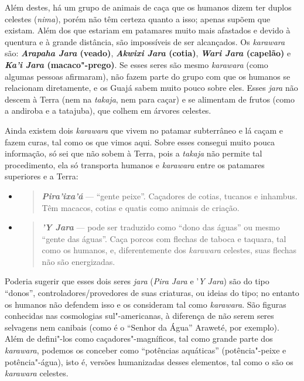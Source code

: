 Além destes, há um grupo de animais de caça que os humanos dizem ter
duplos celestes (\emph{nima}), porém não têm certeza quanto a isso;
apenas supõem que existam. Além dos que estariam em patamares muito mais
afastados e devido à quentura e à grande distância, são impossíveis de
ser alcançados. Os \emph{karawara} são: \textbf{\emph{Arapaha Jara}
(veado)}, \textbf{\emph{Akwixi Jara} (cotia)}, \textbf{\emph{Wari Jara}
(capelão)} e \textbf{\emph{Ka'i Jara} (macaco"-prego)}. Se esses seres
são mesmo \emph{karawara} (como algumas pessoas afirmaram), não fazem
parte do grupo com que os humanos se relacionam diretamente, e os Guajá
sabem muito pouco sobre eles. Esses \emph{jara} não descem à Terra (nem
na \emph{takaja}, nem para caçar) e se alimentam de frutos (como a
andiroba e a tatajuba), que colhem em árvores celestes.

Ainda existem dois \emph{karawara} que vivem no patamar subterrâneo e lá
caçam e fazem curas, tal como os que vimos aqui. Sobre esses consegui
muito pouca informação, só sei que não sobem à Terra, pois a
\emph{takaja} não permite tal procedimento, ela só transporta humanos e
\emph{karawara} entre os patamares superiores e a Terra:

\begin{itemize}
\item
  \begin{quote}
  \emph{\textbf{Pira'ixa'á}} --- ``gente peixe''. Caçadores de cotias,
  tucanos e inhambus. Têm macacos, cotias e quatis como animais de
  criação. 
  \end{quote}
\item
  \begin{quote}
  \emph{\textbf{'Y Jara}} --- pode ser traduzido como ``dono das águas'' ou
  mesmo ``gente das águas''. Caça porcos com flechas de taboca e
  taquara, tal como os humanos, e, diferentemente dos \emph{karawara}
  celestes, suas flechas não são energizadas.
  \end{quote}
\end{itemize}

Poderia sugerir que esses dois seres \emph{jara} (\emph{Pira Jara} e
'\emph{Y Jara}) são do tipo ``donos'', controladores/provedores de suas
criaturas, ou ideias do tipo; no entanto os humanos não defendem isso e
os consideram tal como \emph{karawara}. São figuras conhecidas nas
cosmologias sul"-americanas, à diferença de não serem seres selvagens nem
canibais (como é o ``Senhor da Água'' Araweté, por exemplo). Além de
defini"-los como caçadores"-magníficos, tal como grande parte dos
\emph{karawara}, podemos os conceber como ``potências aquáticas''
(potência"-peixe e potência"-água), isto é, versões humanizadas desses
elementos, tal como o são os \emph{karawara} celestes.

